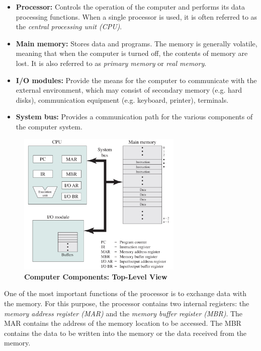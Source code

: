 \documentclass{article}
\begin{document}
\begin{itemize}
    \item \textbf{Processor:} Controls the operation of the computer and performs its data processing functions. When a 
    single processor is used, it is often referred to as the \textit{central processing unit (CPU)}.
    \item \textbf{Main memory:} Stores data and programs. The memory is generally volatile, meaning that when the computer is
    turned off, the contents of memory are lost. It is also referred to as \textit{primary memory} or \textit{real memory}.
    \item \textbf{I/O modules:} Provide the means for the computer to communicate with the external environment, which may 
    consist of secondary memory (e.g. hard disks), communication equipment (e.g. keyboard, printer), terminals.
    \item \textbf{System bus:} Provides a communication path for the various components of the computer system.
\end{itemize}
\begin{figure}[!h]
    \centering
    \includegraphics[width=0.7\textwidth]{figures/Ch01Figure1.png} %
    \caption{\textbf{Computer Components: Top-Level View}}
    \label{fig:Ch01Fig1}
\end{figure}

One of the most important functions of the processor is to exchange data with the memory.
For this purpose, the processor contains two internal registers: the \textit{memory address register (MAR)} and the
\textit{memory buffer register (MBR)}. The MAR contains the address of the memory location to be accessed. The MBR
contains the data to be written into the memory or the data received from the memory.
\end{document}
